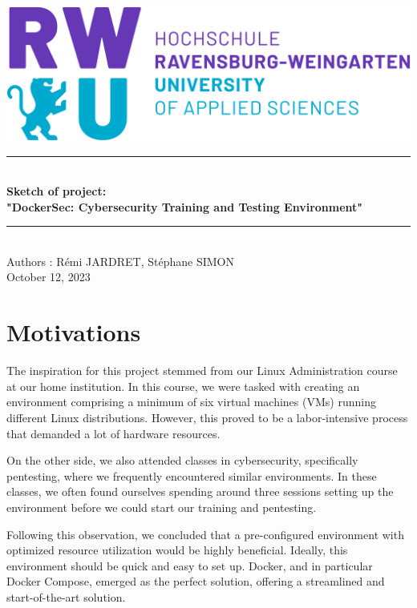 \documentclass[a4paper,10pt]{article}
\begin{document}
\begin{titlepage}
\pagestyle{empty}
\newcommand{\HRule}{\rule{\linewidth}{0.5mm}}
\center
\textsc{ } \\[3cm]
\includegraphics[scale=0.25]{images/rwu_logo.png} \\[4cm]
\HRule \\[0.4cm]
{ \huge \bfseries Sketch of project: \\[0.15cm] 
 "DockerSec: Cybersecurity Training and Testing Environment" \\[0.4cm]}
\HRule \\[8.6cm]
Authors : 
Rémi JARDRET, Stéphane SIMON\\[0.3cm]
October 12, 2023 \\ [1cm]
\end{titlepage}

\begin{titlepage}
\pagestyle{empty}
\renewcommand{\contentsname}{\center Table of contents\\[2cm]}
\tableofcontents
\end{titlepage}

\section{Motivations}
The inspiration for this project stemmed from our Linux Administration course at our home institution. In this course, we were tasked with creating an environment comprising a minimum of six virtual machines (VMs) running different Linux distributions. However, this proved to be a labor-intensive process that demanded a lot of hardware resources.\par
On the other side, we also attended classes in cybersecurity, specifically pentesting, where we frequently encountered similar environments. In these classes, we often found ourselves spending around three sessions setting up the environment before we could start our training and pentesting.\par
Following this observation, we concluded that a pre-configured environment with optimized resource utilization would be highly beneficial. Ideally, this environment should be quick and easy to set up. Docker, and in particular Docker Compose, emerged as the perfect solution, offering a streamlined and start-of-the-art solution.
\end{document}
